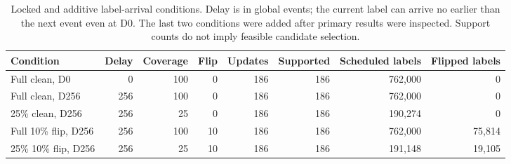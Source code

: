 \begin{table}[!htbp]
\centering
\caption{Locked and additive label-arrival conditions. Delay is in global events; the current label can arrive no earlier than the next event even at D0. The last two conditions were added after primary results were inspected. Support counts do not imply feasible candidate selection.}
\label{tab:supp_feedback}
\scriptsize
\setlength{\tabcolsep}{3pt}
\begin{tabular}{lrrrrrrr}
\toprule
Condition & Delay & Coverage & Flip & Updates & Supported & Scheduled labels & Flipped labels\\
\midrule
Full clean, D0 & 0 & 100 & 0 & 186 & 186 & 762,000 & 0 \\
Full clean, D256 & 256 & 100 & 0 & 186 & 186 & 762,000 & 0 \\
25\% clean, D256 & 256 & 25 & 0 & 186 & 186 & 190,274 & 0 \\
Full 10\% flip, D256 & 256 & 100 & 10 & 186 & 186 & 762,000 & 75,814 \\
25\% 10\% flip, D256 & 256 & 25 & 10 & 186 & 186 & 191,148 & 19,105 \\
\bottomrule
\end{tabular}
\end{table}
